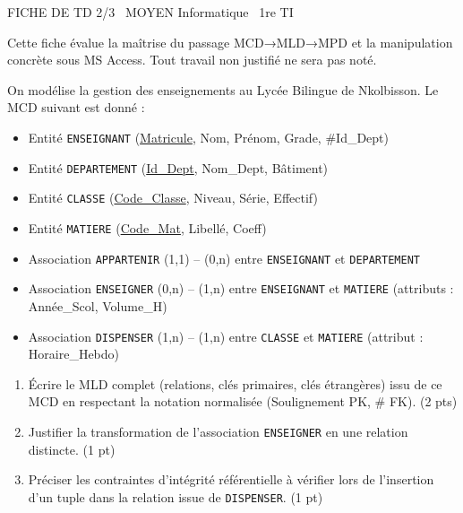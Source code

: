 \documentclass[11pt]{article}
\begin{document}
\begin{tcolorbox}[enhanced,colback=popink,colframe=popink,arc=10pt,boxrule=0pt,left=12pt,right=12pt,top=9pt,bottom=9pt]
{\color{white}\popxbold\small FICHE DE TD 2/3 \textbullet\ MOYEN \hfill Informatique \textbullet\ 1re TI\par}
\end{tcolorbox}
\vspace{4pt}
Cette fiche évalue la maîtrise du passage MCD→MLD→MPD et la manipulation concrète sous MS Access. Tout travail non justifié ne sera pas noté.

\begin{exercice}
On modélise la gestion des enseignements au Lycée Bilingue de Nkolbisson. Le MCD suivant est donné :
\begin{itemize}
    \item Entité \texttt{ENSEIGNANT} (\underline{Matricule}, Nom, Prénom, Grade, \#Id\_Dept)
    \item Entité \texttt{DEPARTEMENT} (\underline{Id\_Dept}, Nom\_Dept, Bâtiment)
    \item Entité \texttt{CLASSE} (\underline{Code\_Classe}, Niveau, Série, Effectif)
    \item Entité \texttt{MATIERE} (\underline{Code\_Mat}, Libellé, Coeff)
    \item Association \texttt{APPARTENIR} (1,1) -- (0,n) entre \texttt{ENSEIGNANT} et \texttt{DEPARTEMENT}
    \item Association \texttt{ENSEIGNER} (0,n) -- (1,n) entre \texttt{ENSEIGNANT} et \texttt{MATIERE} (attributs : Année\_Scol, Volume\_H)
    \item Association \texttt{DISPENSER} (1,n) -- (1,n) entre \texttt{CLASSE} et \texttt{MATIERE} (attribut : Horaire\_Hebdo)
\end{itemize}
\begin{enumerate}
    \item Écrire le MLD complet (relations, clés primaires, clés étrangères) issu de ce MCD en respectant la notation normalisée (Soulignement PK, \# FK). (2 pts)
    \item Justifier la transformation de l'association \texttt{ENSEIGNER} en une relation distincte. (1 pt)
    \item Préciser les contraintes d'intégrité référentielle à vérifier lors de l'insertion d'un tuple dans la relation issue de \texttt{DISPENSER}. (1 pt)
\end{enumerate}
\end{exercice}
\end{document}
